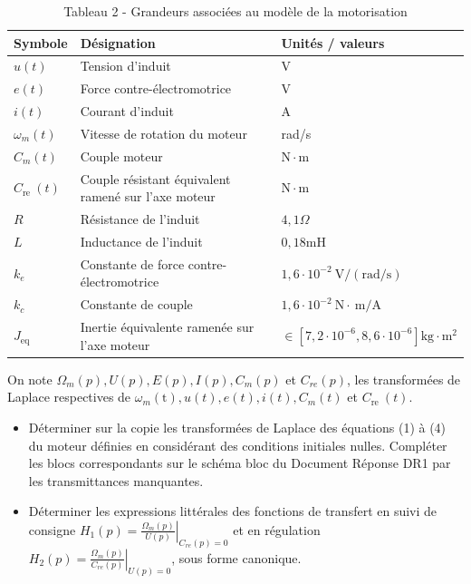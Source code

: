 \begin{table}[h]
\begin{center}
\begin{tabular}[t]{|l|l|l|}
\hline
Symbole & Désignation & Unités / valeurs \\
\hline
$u(t)$ & Tension d'induit & V \\
\hline
$e(t)$ & Force contre-électromotrice & V \\
\hline
$i(t)$ & Courant d'induit & A \\
\hline
$\omega_{m}(t)$ & Vitesse de rotation du moteur & rad/s \\
\hline
$C_{m}(t)$ & Couple moteur & $\mathrm{N} \cdot \mathrm{m}$ \\
\hline
$C_{\text {re }}(t)$ & Couple résistant équivalent ramené sur l'axe moteur & $\mathrm{N} \cdot \mathrm{m}$ \\
\hline
$R$ & Résistance de l'induit & $4,1 \Omega$ \\
\hline
$L$ & Inductance de l'induit & $0,18 \mathrm{mH}$ \\
\hline
$k_{e}$ & Constante de force contre-électromotrice & $1,6 \cdot 10^{-2} \mathrm{~V} /(\mathrm{rad} / \mathrm{s})$ \\
\hline
$k_{c}$ & Constante de couple & $1,6 \cdot 10^{-2} \mathrm{~N} \cdot \mathrm{~m} / \mathrm{A}$ \\
\hline
$J_{\text {eq }}$ & Inertie équivalente ramenée sur l'axe moteur & $\in\left[7,2 \cdot 10^{-6}, 8,6 \cdot 10^{-6}\right] \mathrm{kg} \cdot \mathrm{m}^{2}$ \\
\hline
\end{tabular}
\captionsetup{labelformat=empty}
\caption{Tableau 2 - Grandeurs associées au modèle de la motorisation}
\end{center}
\end{table}

On note $\Omega_{m}(p), U(p), E(p), I(p), C_{m}(p)$ et $C_{r e}(p)$, les transformées de Laplace respectives de $\omega_{m}(\mathrm{t}), u(t), e(t), i(t), C_{m}(t)$ et $C_{\text {re }}(t)$.

\begin{itemize}
  \item[Q11.] Déterminer sur la copie les transformées de Laplace des équations (1) à (4) du moteur définies en considérant des conditions initiales nulles. Compléter les blocs correspondants sur le schéma bloc du Document Réponse DR1 par les transmittances manquantes.
  \item[Q12.] Déterminer les expressions littérales des fonctions de transfert en suivi de consigne $H_{1}(p)=\left.\frac{\Omega_{m}(p)}{U(p)}\right|_{C_{r e}(p)=0}$ et en régulation $H_{2}(p)=\left.\frac{\Omega_{m}(p)}{C_{r e}(p)}\right|_{U(p)=0}$, sous forme canonique.
\end{itemize}

